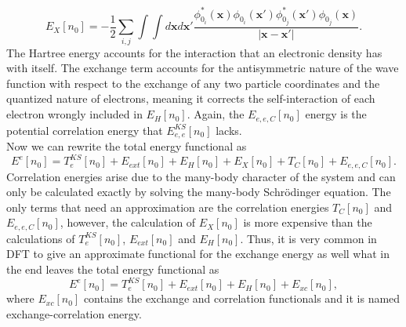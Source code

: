 \begin{equation}
 E_{X}[n_{0}]=-\frac{1}{2}\sum_{i,j}\int{\int{d\mathbf{x}d\mathbf{x}'\frac{\phi_{0_{i}}^{*}(\mathbf{x})\phi_{0_{i}}(\mathbf{x}')\phi_{0_{j}}^{*}(\mathbf{x}')\phi_{0_{j}}(\mathbf{
 x})}{|\mathbf{x}-\mathbf{x}'|}}}.
\end{equation}
The Hartree energy accounts for the interaction that an electronic density has with itself. The exchange term accounts for the antisymmetric nature of the wave function with respect to the exchange of any two particle coordinates 
and the quantized nature of electrons, meaning it corrects the self-interaction of each electron wrongly included in $E_{H}[n_{0}]$. Again, the $E_{e,e,C}[n_{0}]$ energy is the potential correlation energy 
that $E_{e,e}^{KS}[n_{0}]$ lacks. \\

Now we can rewrite the total energy functional as
\begin{equation}
 E^{e}[n_{0}]=T_{e}^{KS}[n_{0}]+E_{ext}[n_{0}]+E_{H}[n_{0}]+E_{X}[n_{0}]+T_{C}[n_{0}]+E_{e,e,C}[n_{0}].
\end{equation}
Correlation energies arise due to the many-body character of the system and can only be calculated exactly by solving the many-body Schr\"odinger equation\cite{ceperley1980ground}. The only terms that need an approximation are the 
correlation energies $T_{C}[n_{0}]$ and $E_{e,e,C}[n_{0}]$, however, the calculation of $E_{X}[n_{0}]$ is more expensive than the calculations of $T_{e}^{KS}[n_{0}]$, $E_{ext}[n_{0}]$ and $E_{H}[n_{0}]$. Thus, it 
is very common in DFT to give an approximate functional for the exchange energy as well what in the end leaves the total energy functional as
\begin{equation}
 E^{e}[n_{0}]=T_{e}^{KS}[n_{0}]+E_{ext}[n_{0}]+E_{H}[n_{0}]+E_{xc}[n_{0}],
\end{equation}
where $E_{xc}[n_{0}]$ contains the exchange and correlation functionals and it is named exchange-correlation energy. \\

